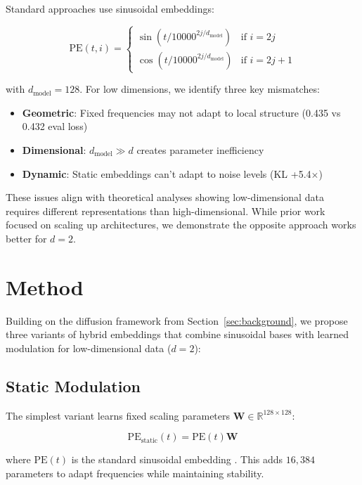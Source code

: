 \documentclass{article} %
\begin{document}
Standard approaches \citep{ddpm} use sinusoidal embeddings:

\begin{equation}
    \text{PE}(t, i) = \begin{cases}
    \sin(t/10000^{2j/d_{\text{model}}}) & \text{if } i=2j \\
    \cos(t/10000^{2j/d_{\text{model}}}) & \text{if } i=2j+1
    \end{cases}
\end{equation}

with $d_{\text{model}}=128$. For low dimensions, we identify three key mismatches:
\begin{itemize}
    \item \textbf{Geometric}: Fixed frequencies may not adapt to local structure (0.435 vs 0.432 eval loss)
    \item \textbf{Dimensional}: $d_{\text{model}} \gg d$ creates parameter inefficiency
    \item \textbf{Dynamic}: Static embeddings can't adapt to noise levels (KL +5.4$\times$)
\end{itemize}

These issues align with theoretical analyses \citep{Chen2018TheSM} showing low-dimensional data requires different representations than high-dimensional. While prior work \citep{edm} focused on scaling up architectures, we demonstrate the opposite approach works better for $d=2$.

\section{Method}
\label{sec:method}

Building on the diffusion framework from Section~\ref{sec:background}, we propose three variants of hybrid embeddings that combine sinusoidal bases with learned modulation for low-dimensional data ($d=2$):

\subsection{Static Modulation}
The simplest variant learns fixed scaling parameters $\mathbf{W} \in \mathbb{R}^{128\times128}$:

\begin{equation}
    \text{PE}_{\text{static}}(t) = \text{PE}(t)\mathbf{W}
\end{equation}

where $\text{PE}(t)$ is the standard sinusoidal embedding \citep{ddpm}. This adds $16,\!384$ parameters to adapt frequencies while maintaining stability.
\end{document}
